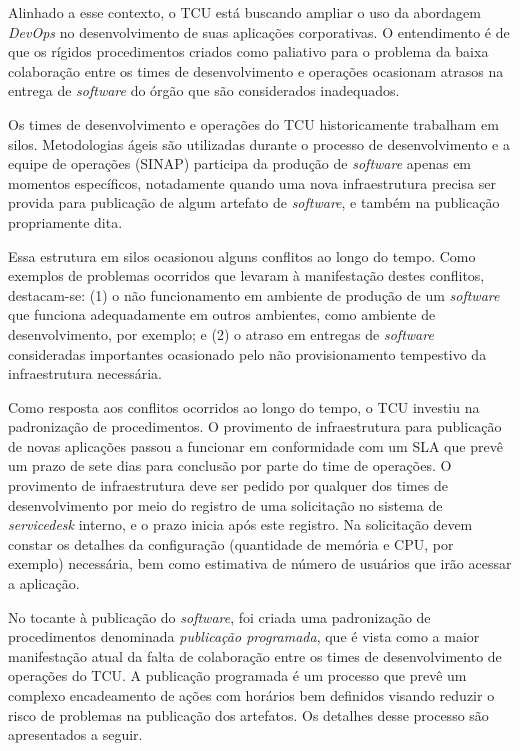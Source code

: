 Alinhado a esse contexto, o \acrfull{TCU} está buscando ampliar o uso da abordagem
\textit{DevOps} no desenvolvimento de suas aplicações corporativas. O
entendimento é de que os rígidos procedimentos criados como paliativo para o
problema da baixa colaboração entre os times de desenvolvimento e operações
ocasionam atrasos na entrega de \textit{software} do órgão que são considerados
inadequados.

Os times de desenvolvimento e operações do \acrshort{TCU} historicamente
trabalham em silos. Metodologias ágeis são utilizadas durante o processo de
desenvolvimento e a equipe de operações (\acrfull{SINAP}) participa da produção
de \textit{software} apenas em momentos específicos, notadamente quando uma nova
infraestrutura precisa ser provida para publicação de algum artefato de
\textit{software}, e também na publicação propriamente dita.

Essa estrutura em silos ocasionou alguns conflitos ao longo do tempo. Como
exemplos de problemas ocorridos que levaram à manifestação
destes conflitos, destacam-se: (1) o não funcionamento em ambiente de produção
de um \textit{software} que funciona adequadamente
em outros ambientes, como ambiente de desenvolvimento, por exemplo; e (2) o
atraso em entregas de \textit{software} consideradas importantes ocasionado
pelo não provisionamento tempestivo da infraestrutura necessária.

Como resposta aos conflitos ocorridos ao longo do tempo, o \acrshort{TCU}
investiu na padronização de procedimentos. O provimento de infraestrutura
para publicação de novas aplicações passou a funcionar em conformidade com um
\acrfull{SLA} que prevê um prazo de sete dias para conclusão por parte do time
de operações. O provimento de infraestrutura deve ser pedido por qualquer
dos times de desenvolvimento por meio do registro de uma solicitação no sistema
de \textit{servicedesk} interno, e o prazo inicia após este registro.
Na solicitação devem constar os detalhes da configuração (quantidade de memória
e CPU, por exemplo) necessária, bem como estimativa de número de usuários que
irão acessar a aplicação.

No tocante à publicação do \textit{software}, foi criada uma padronização de
procedimentos denominada \emph{publicação programada}, que é vista como a maior
manifestação atual da falta de colaboração entre os times de desenvolvimento
de operações do \acrshort{TCU}. A publicação programada
é um processo que prevê um complexo encadeamento de ações com horários bem
definidos visando reduzir o risco de problemas na publicação dos artefatos. Os
detalhes desse processo são apresentados a seguir.

